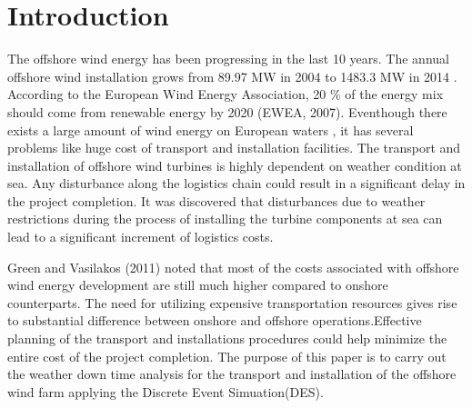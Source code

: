 \section{Introduction}
The offshore wind energy has been progressing in the last 10 years. The annual offshore wind installation grows from 89.97 MW in 2004 to 1483.3 MW in 2014 \cite{Giorgio2015}. According to the European Wind Energy Association, 20 \% of the energy mix should come from renewable energy by 2020 (EWEA, 2007). Eventhough there exists a large amount of wind energy on European waters , it has several problems like huge cost of transport and installation facilities. The transport and installation of offshore wind turbines is highly dependent on weather condition at sea. Any disturbance along the logistics chain could result in a significant delay in the project completion. It was discovered \cite{Lange2012} that disturbances due to weather restrictions during the process of installing the turbine components at sea can lead to a significant increment of logistics costs.

Green and Vasilakos (2011) noted that most of the costs associated with offshore wind energy development are still much higher compared to onshore counterparts. The need for utilizing expensive transportation resources gives rise to substantial difference between onshore and offshore operations.Effective planning of the transport and installations procedures could help minimize the entire cost of the project completion. The purpose of this paper is to carry out the weather down time analysis for the transport and installation of the offshore wind farm applying the Discrete Event Simuation(DES).